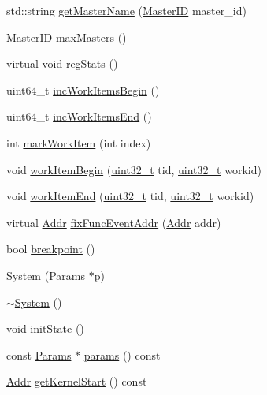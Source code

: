 \begin{DoxyCompactItemize}
\item 
std::string \hyperlink{classSystem_a810ce26f2e58138568d11cf179d6e89d}{getMasterName} (\hyperlink{request_8hh_ac366b729262fd8e7cbd3283da6f775cf}{MasterID} master\_\-id)
\item 
\hyperlink{request_8hh_ac366b729262fd8e7cbd3283da6f775cf}{MasterID} \hyperlink{classSystem_a4cd916c36458ce47e9ba4ccbfc75a095}{maxMasters} ()
\item 
virtual void \hyperlink{classSystem_a4dc637449366fcdfc4e764cdf12d9b11}{regStats} ()
\item 
uint64\_\-t \hyperlink{classSystem_a3820060901c04aa2e536f374113a1daf}{incWorkItemsBegin} ()
\item 
uint64\_\-t \hyperlink{classSystem_a46800c998630f686bcdea38091fab11d}{incWorkItemsEnd} ()
\item 
int \hyperlink{classSystem_ae49314d8f9b44248e8b0577e5cdd0338}{markWorkItem} (int index)
\item 
void \hyperlink{classSystem_ad4b75de1d7e8c59fae68c3d0c1aa10d0}{workItemBegin} (\hyperlink{Type_8hh_a435d1572bf3f880d55459d9805097f62}{uint32\_\-t} tid, \hyperlink{Type_8hh_a435d1572bf3f880d55459d9805097f62}{uint32\_\-t} workid)
\item 
void \hyperlink{classSystem_a5a8ccc590b04e540dab229b302e29c88}{workItemEnd} (\hyperlink{Type_8hh_a435d1572bf3f880d55459d9805097f62}{uint32\_\-t} tid, \hyperlink{Type_8hh_a435d1572bf3f880d55459d9805097f62}{uint32\_\-t} workid)
\item 
virtual \hyperlink{base_2types_8hh_af1bb03d6a4ee096394a6749f0a169232}{Addr} \hyperlink{classSystem_aff94f650c5eef23b8dc350ea755bdef4}{fixFuncEventAddr} (\hyperlink{base_2types_8hh_af1bb03d6a4ee096394a6749f0a169232}{Addr} addr)
\item 
bool \hyperlink{classSystem_ae59ed2201db88c0668ca26040f6a3ad0}{breakpoint} ()
\item 
\hyperlink{classSystem_a0b8704078300e9b3cd65559df0ac79ab}{System} (\hyperlink{classSystem_a5f461be6222ce76bffcb70f27d820c56}{Params} $\ast$p)
\item 
\hyperlink{classSystem_a3bfbca0e3ddd7ea1f8709c986454d753}{$\sim$System} ()
\item 
void \hyperlink{classSystem_a3c34ea9b29f410748d4435a667484924}{initState} ()
\item 
const \hyperlink{classSystem_a5f461be6222ce76bffcb70f27d820c56}{Params} $\ast$ \hyperlink{classSystem_acd3c3feb78ae7a8f88fe0f110a718dff}{params} () const 
\item 
\hyperlink{base_2types_8hh_af1bb03d6a4ee096394a6749f0a169232}{Addr} \hyperlink{classSystem_a5e068cbb27ba6c95ea26869f88964845}{getKernelStart} () const 

\end{DoxyCompactItemize}
